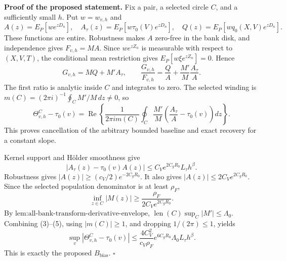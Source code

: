 \textbf{Proof of the proposed statement.}
Fix a pair, a selected circle \(C\), and a sufficiently small \(h\). Put \(w=w_{v,h}\) and
\[
 A(z)=E_P[we^{zD_n}],\quad
 A_\tau(z)=E_P[w\tau_0(V)e^{zD_n}],\quad
 Q(z)=E_P[wq_0(X,V)e^{zD_n}]. \tag{1}
\]
These functions are entire. Robustness makes \(A\) zero-free in the bank disk, and independence gives \(F_{v,h}=MA\). Since \(we^{zZ_n}\) is measurable with respect to \((X,V,T)\), the conditional mean restriction gives \(E_P[w\xi e^{zZ_n}]=0\). Hence
\[
 G_{v,h}=MQ+M'A_\tau,\qquad
 \frac{G_{v,h}}{F_{v,h}}=\frac QA+\frac{M'}M\frac{A_\tau}{A}. \tag{2}
\]
The first ratio is analytic inside \(C\) and integrates to zero. The selected winding is \(m(C)=(2\pi i)^{-1}\oint_C M'/M\,dz\ne0\), so
\[
 \Theta^C_{v,h}-\tau_0(v)
 =\operatorname{Re}\left\{\frac1{2\pi i m(C)}\oint_C\frac{M'}M
 \left(\frac{A_\tau}{A}-\tau_0(v)\right)dz\right\}. \tag{3}
\]
This proves cancellation of the arbitrary bounded baseline and exact recovery for a constant slope.

Kernel support and H\"older smoothness give
\[
 |A_\tau(z)-\tau_0(v)A(z)|
 \le C_Ve^{2C_gR_0}L_\tau h^\beta. \tag{4}
\]
Robustness gives \(|A(z)|\ge(c_V/2)e^{-2C_gR_0}\). It also gives \(|A(z)|\le2C_Ve^{2C_gR_0}\). Since the selected population denominator is at least \(\rho_F\),
\[
 \inf_{z\in C}|M(z)|\ge\frac{\rho_F}{2C_Ve^{2C_gR_0}}. \tag{5}
\]
By \(\text{lem:all-bank-transform-derivative-envelope}\), \(\operatorname{len}(C)\sup_C|M'|\le\Lambda_0\). Combining (3)--(5), using \(|m(C)|\ge1\), and dropping \(1/(2\pi)\le1\), yields
\[
 \sup_v|\Theta^C_{v,h}-\tau_0(v)|
 \le\frac{4C_V^2}{c_V\rho_F}e^{6C_gR_0}\Lambda_0L_\tau h^\beta.
\]
This is exactly the proposed \(B_{\mathrm{bias}}\). \(\square\)
